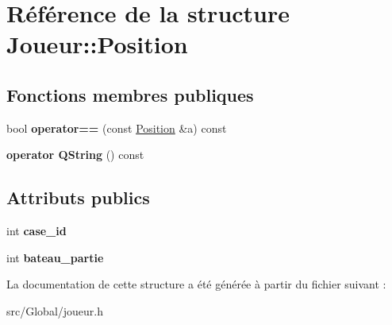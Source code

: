 \hypertarget{struct_joueur_1_1_position}{}\section{Référence de la structure Joueur\+:\+:Position}
\label{struct_joueur_1_1_position}
\subsection*{Fonctions membres publiques}
\begin{DoxyCompactItemize}
\item 
bool {\bfseries operator==} (const \hyperlink{struct_joueur_1_1_position}{Position} \&a) const \hypertarget{struct_joueur_1_1_position_a4e5bcfaa0ed20ecf1b9514f307979498}{}\label{struct_joueur_1_1_position_a4e5bcfaa0ed20ecf1b9514f307979498}

\item 
{\bfseries operator Q\+String} () const \hypertarget{struct_joueur_1_1_position_a71fe6feabb1b43d4e99b05e66931999d}{}\label{struct_joueur_1_1_position_a71fe6feabb1b43d4e99b05e66931999d}

\end{DoxyCompactItemize}
\subsection*{Attributs publics}
\begin{DoxyCompactItemize}
\item 
int {\bfseries case\+\_\+id}\hypertarget{struct_joueur_1_1_position_af3f0ac35c0e10cfc1ce7c4c5ab597c58}{}\label{struct_joueur_1_1_position_af3f0ac35c0e10cfc1ce7c4c5ab597c58}

\item 
int {\bfseries bateau\+\_\+partie}\hypertarget{struct_joueur_1_1_position_a56b4777ed97a2ef2a1462a54103e5668}{}\label{struct_joueur_1_1_position_a56b4777ed97a2ef2a1462a54103e5668}

\end{DoxyCompactItemize}


La documentation de cette structure a été générée à partir du fichier suivant \+:\begin{DoxyCompactItemize}
\item 
src/\+Global/joueur.\+h\end{DoxyCompactItemize}
